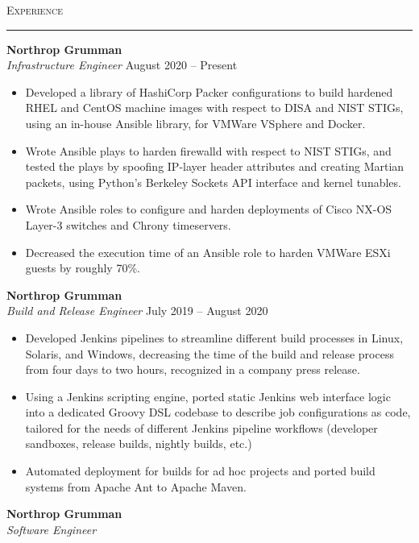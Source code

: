 \documentclass{res}
\begin{document}
\begin{resume}
\textsc{{\Large Experience}}
\vspace{0.5mm}
\hrule width18.5cm
\textbf{Northrop Grumman}\\
\textit{Infrastructure Engineer}
\hfill
August 2020 -- Present\\[1mm]
	\begin{itemize}
		\vspace{-3mm}
    \item Developed a library of HashiCorp Packer configurations to build hardened RHEL and CentOS machine images with respect to DISA and NIST STIGs, using an in-house Ansible library, for VMWare VSphere and Docker.
    \item Wrote Ansible plays to harden firewalld with respect to NIST STIGs, and tested the plays by spoofing IP-layer header attributes and creating Martian packets, using Python's Berkeley Sockets API interface and kernel tunables.
    \item Wrote Ansible roles to configure and harden deployments of Cisco NX-OS Layer-3 switches and Chrony timeservers.
    \item Decreased the execution time of an Ansible role to harden VMWare ESXi guests by roughly 70\%.
  \end{itemize}
\textbf{Northrop Grumman}\\
\textit{Build and Release Engineer}
\hfill
July 2019 -- August 2020\\[1mm]
	\begin{itemize}
		\vspace{-3mm}
    \item Developed Jenkins pipelines to streamline different build processes in Linux, Solaris, and Windows, decreasing the time of the build and release process from four days to two hours, recognized in a company press release.
    \item Using a Jenkins scripting engine, ported static Jenkins web interface logic into a dedicated Groovy DSL codebase to describe job configurations as code, tailored for the needs of different Jenkins pipeline workflows (developer sandboxes, release builds, nightly builds, etc.)
    \item Automated deployment for builds for ad hoc projects and ported build systems from Apache Ant to Apache Maven.
  \end{itemize}
\textbf{Northrop Grumman}\\
\textit{Software Engineer}

\end{resume}
\end{document}
